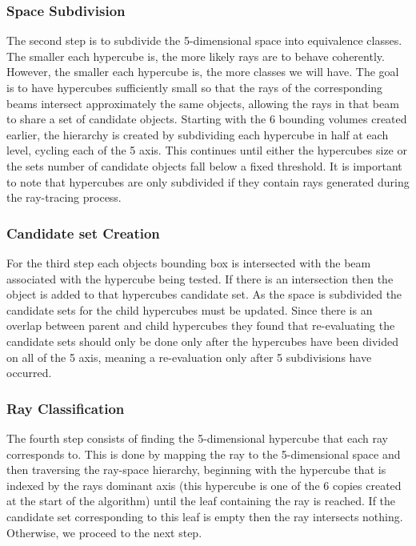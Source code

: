 \documentclass{llncs}
\begin{document}
\subsubsection{Space Subdivision}

The second step is to subdivide the 5-dimensional space into equivalence classes. The smaller each hypercube is, the more likely rays are to behave coherently. However, the smaller each hypercube is, the more classes we will have. The goal is to have hypercubes sufficiently small so that the rays of the corresponding beams intersect approximately the same objects, allowing the rays in that beam to share a set of candidate objects. Starting with the 6 bounding volumes created earlier, the hierarchy is created by subdividing each hypercube in half at each level, cycling each of the 5 axis. This continues until either the hypercubes size or the sets number of candidate objects fall below a fixed threshold. It is important to note that hypercubes are only subdivided if they contain rays generated during the ray-tracing process.

\subsubsection{Candidate set Creation}

For the third step each objects bounding box is intersected with the beam associated with the hypercube being tested. If there is an intersection then the object is added to that hypercubes candidate set. As the space is subdivided the candidate sets for the child hypercubes must be updated. Since there is an overlap between parent and child hypercubes they found that re-evaluating the candidate sets should only be done only after the hypercubes have been divided on all of the 5 axis, meaning a re-evaluation only after 5 subdivisions have occurred.

\subsubsection{Ray Classification}

The fourth step consists of finding the 5-dimensional hypercube that each ray corresponds to. This is done by mapping the ray to the 5-dimensional space and then traversing the ray-space hierarchy, beginning with the hypercube that is indexed by the rays dominant axis (this hypercube is one of the 6 copies created at the start of the algorithm) until the leaf containing the ray is reached. If the candidate set corresponding to this leaf is empty then the ray intersects nothing. Otherwise, we proceed to the next step.
\end{document}
